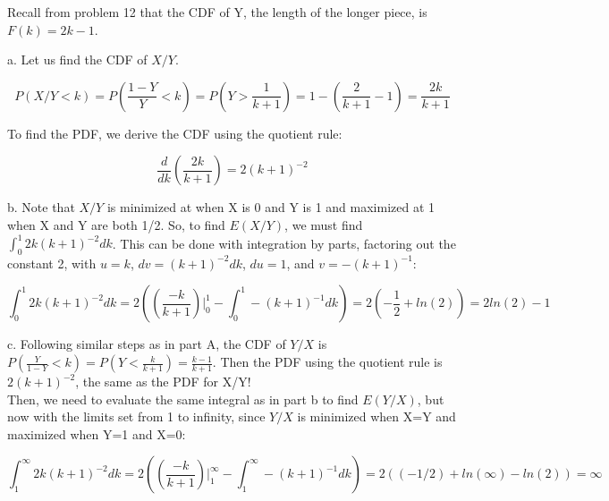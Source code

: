 Recall from problem 12 that the CDF of Y, the length of the longer piece, is \(F(k) = 2k-1\).

a. Let us find the CDF of \(X/Y\). 

\[P(X/Y < k) = P(\frac{1-Y}{Y} < k )= P(Y>\frac{1}{k+1}) = 1 - (\frac{2}{k+1} - 1) = \frac{2k}{k+1}\]

To find the PDF, we derive the CDF using the quotient rule:

\[\frac{d}{dk}(\frac{2k}{k+1}) = 2(k+1)^{-2}\]

b. Note that \(X/Y\) is minimized at when X is 0 and Y is 1 and maximized at 1 when X and Y are both 1/2. So, to find \(E(X/Y)\), we must find \(\int_{0}^{1}2k(k+1)^{-2}dk\). This can be done with integration by parts, factoring out the constant 2, with \(u = k\), \(dv = (k+1)^{-2}dk\), \(du = 1\), and \(v = -(k+1)^{-1}\):

\[\int_{0}^{1}2k(k+1)^{-2}dk = 2((\frac{-k}{k+1})|^{1}_{0} - \int_{0}^{1}-(k+1)^{-1}dk) =2(-\frac{1}{2} + ln(2)) = 2ln(2)-1 \]

c. Following similar steps as in part A, the CDF of \(Y/X\) is \(P(\frac{Y}{1-Y}<k) = P(Y<\frac{k}{k+1}) = \frac{k-1}{k+1}\). Then the PDF using the quotient rule is \(2(k+1)^{-2}\), the same as the PDF for X/Y! \\

Then, we need to evaluate the same integral as in part b to find \(E(Y/X)\), but now with the limits set from 1 to infinity, since \(Y/X\) is minimized when X=Y and maximized when Y=1 and X=0:

\[\int_{1}^{\infty}2k(k+1)^{-2}dk = 2((\frac{-k}{k+1})|^{\infty}_{1} - \int_{1}^{\infty
}-(k+1)^{-1}dk) = 2((-1/2) + ln(\infty) - ln(2)) = \infty\]
